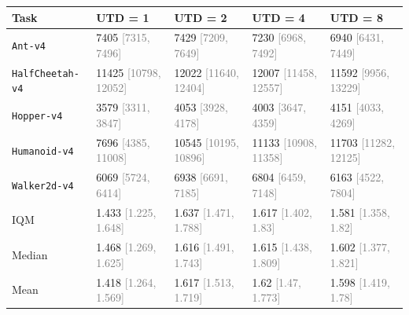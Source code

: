 \begin{tabular}{lllll}
\toprule
\textbf{Task} & \textbf{UTD = 1} & \textbf{UTD = 2} & \textbf{UTD = 4} & \textbf{UTD = 8} \\
\midrule
\texttt{Ant-v4} & 7405 \textcolor{gray}{[7315, 7496]} & 7429 \textcolor{gray}{[7209, 7649]} & 7230 \textcolor{gray}{[6968, 7492]} & 6940 \textcolor{gray}{[6431, 7449]} \\
\texttt{HalfCheetah-v4} & 11425 \textcolor{gray}{[10798, 12052]} & 12022 \textcolor{gray}{[11640, 12404]} & 12007 \textcolor{gray}{[11458, 12557]} & 11592 \textcolor{gray}{[9956, 13229]} \\
\texttt{Hopper-v4} & 3579 \textcolor{gray}{[3311, 3847]} & 4053 \textcolor{gray}{[3928, 4178]} & 4003 \textcolor{gray}{[3647, 4359]} & 4151 \textcolor{gray}{[4033, 4269]} \\
\texttt{Humanoid-v4} & 7696 \textcolor{gray}{[4385, 11008]} & 10545 \textcolor{gray}{[10195, 10896]} & 11133 \textcolor{gray}{[10908, 11358]} & 11703 \textcolor{gray}{[11282, 12125]} \\
\texttt{Walker2d-v4} & 6069 \textcolor{gray}{[5724, 6414]} & 6938 \textcolor{gray}{[6691, 7185]} & 6804 \textcolor{gray}{[6459, 7148]} & 6163 \textcolor{gray}{[4522, 7804]} \\
IQM & 1.433 \textcolor{gray}{[1.225, 1.648]} & 1.637 \textcolor{gray}{[1.471, 1.788]} & 1.617 \textcolor{gray}{[1.402, 1.83]} & 1.581 \textcolor{gray}{[1.358, 1.82]} \\
Median & 1.468 \textcolor{gray}{[1.269, 1.625]} & 1.616 \textcolor{gray}{[1.491, 1.743]} & 1.615 \textcolor{gray}{[1.438, 1.809]} & 1.602 \textcolor{gray}{[1.377, 1.821]} \\
Mean & 1.418 \textcolor{gray}{[1.264, 1.569]} & 1.617 \textcolor{gray}{[1.513, 1.719]} & 1.62 \textcolor{gray}{[1.47, 1.773]} & 1.598 \textcolor{gray}{[1.419, 1.78]} \\
\bottomrule
\end{tabular}
